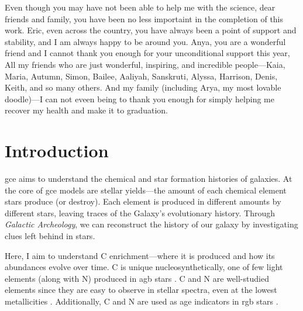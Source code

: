 \documentclass[12pt,oneside,letterpaper]{report}
\newcommand{\agb}{\gls{agb}}
\newcommand{\gce}{\gls{gce}}
\newcommand{\Gce}{\Gls{gce}}
\begin{document}
Even though you may have not been able to help me with the science, dear friends and family, you have been no less importaint in the completion of this work. 
Eric, even across the country, you have always been a point of support and stability, and I am always happy to be around you. Anya, you are a wonderful friend and I cannot thank you enough for your unconditional support this year, 
All my friends who are just wonderful, inspiring, and incredible people---Kaia, Maria, Autumn, Simon, Bailee, Aaliyah, Sanskruti, Alyssa, Harrison, Denis, Keith, and so many others. 
And my family (including Arya, my most lovable doodle)---I can not eveen being to thank you enough for simply helping me recover my health and make it to graduation. 









\tableofcontents
\listoffigures
\listoftables
\newpage
{}









\chapter{Introduction}

\Gce{} aims to understand the chemical and star formation histories of galaxies. At the core of \gce{} models are stellar \gls{yield}s---the amount of each chemical element stars produce (or destroy). Each element is produced in different amounts by different stars, leaving traces of the Galaxy's evolutionary history. Through \textit{Galactic Archeology}, we can reconstruct the history of our galaxy by investigating clues left behind in stars.

Here, I aim to understand C enrichment---where it is produced and how its abundances evolve over time. C is unique nucleosynthetically, one of few light elements (along with N) produced in \agb{} stars \citep[e.g.][]{jennifer19, KL14}. C and N are well-studied elements since they are easy to observe in stellar spectra, even at the lowest metallicities \cite[e.g.][]{fabbian+09, nissen+14, lambert81, laird85, lambert86}. Additionally, C and N are used as age indicators in \gls{rgb} stars \citep{martig16, MG15, hasselquist19, vincenzo+21}.
\end{document}
